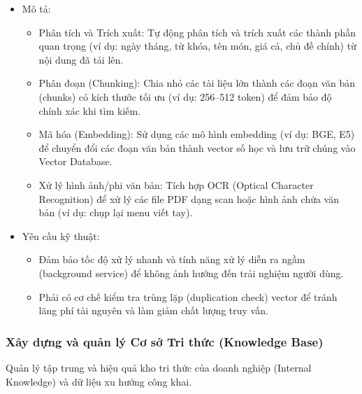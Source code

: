 \begin{itemize}
\item
  Mô tả:

  \begin{itemize}
  \item
    Phân tích và Trích xuất: Tự động phân tích và trích xuất các thành
    phần quan trọng (ví dụ: ngày tháng, từ khóa, tên món, giá cả, chủ đề
    chính) từ nội dung đã tải lên.
  \item
    Phân đoạn (Chunking): Chia nhỏ các tài liệu lớn thành các đoạn văn
    bản (chunks) có kích thước tối ưu (ví dụ: 256--512 token) để đảm bảo
    độ chính xác khi tìm kiếm.
  \item
    Mã hóa (Embedding): Sử dụng các mô hình embedding (ví dụ: BGE, E5)
    để chuyển đổi các đoạn văn bản thành vector số học và lưu trữ chúng
    vào Vector Database.
  \item
    Xử lý hình ảnh/phi văn bản: Tích hợp OCR (Optical Character
    Recognition) để xử lý các file PDF dạng scan hoặc hình ảnh chứa văn
    bản (ví dụ: chụp lại menu viết tay).
  \end{itemize}
\item
  Yêu cầu kỹ thuật:

  \begin{itemize}
  \item
    Đảm bảo tốc độ xử lý nhanh và tính năng xử lý diễn ra ngầm
    (background service) để không ảnh hưởng đến trải nghiệm người dùng.
  \item
    Phải có cơ chế kiểm tra trùng lặp (duplication check) vector để
    tránh lãng phí tài nguyên và làm giảm chất lượng truy vấn.
  \end{itemize}
\end{itemize}

\subsubsection{Xây dựng và quản lý Cơ sở Tri thức (Knowledge
Base)}\label{xuxe2y-dux1ef1ng-vuxe0-quux1ea3n-luxfd-cux1a1-sux1edf-tri-thux1ee9c-knowledge-base}

Quản lý tập trung và hiệu quả kho tri thức của doanh nghiệp (Internal
Knowledge) và dữ liệu xu hướng công khai.

